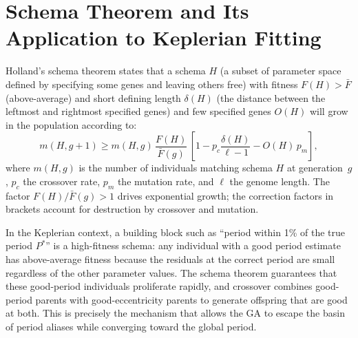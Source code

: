 \documentclass[12pt]{article}
\begin{document}
\section{Schema Theorem and Its Application to Keplerian Fitting}
\label{app:schema}

Holland's \citeyearpar{Holland1975} schema theorem states that a schema
$H$ (a subset of parameter space defined by specifying some genes and
leaving others free) with fitness $F(H) > \bar F$ (above-average) and
short defining length $\delta(H)$ (the distance between the leftmost
and rightmost specified genes) and few specified genes $O(H)$ will grow
in the population according to:
\begin{equation}\label{eq:schema}
  m(H, g+1) \geq m(H,g)\,\frac{F(H)}{\bar F(g)}\,
  \left[1 - p_c\frac{\delta(H)}{\ell-1} - O(H)\,p_m\right],
\end{equation}
where $m(H,g)$ is the number of individuals matching schema $H$ at
generation~$g$, $p_c$ the crossover rate, $p_m$ the mutation rate,
and $\ell$ the genome length.  The factor $F(H)/\bar F(g) > 1$
drives exponential growth; the correction factors in brackets account
for destruction by crossover and mutation.

In the Keplerian context, a building block such as ``period within 1\%
of the true period $P^*$'' is a high-fitness schema: any individual
with a good period estimate has above-average fitness because the
residuals at the correct period are small regardless of the other
parameter values.  The schema theorem guarantees that these good-period
individuals proliferate rapidly, and crossover combines good-period
parents with good-eccentricity parents to generate offspring that are
good at both.  This is precisely the mechanism that allows the GA to
escape the basin of period aliases while converging toward the global
period.

\bigskip


\end{document}

